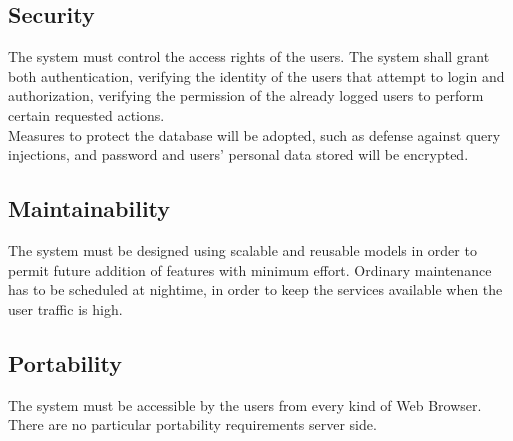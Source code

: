 \subsection{Security}
\label{subsec:security}%
The system must control the access rights of the users. The system shall grant both authentication, verifying the identity of the users that attempt to login and authorization, verifying the permission of the already logged users to perform certain requested actions. \\
Measures to protect the database will be adopted, such as defense against query injections, and password and users' personal data stored will be encrypted.


\subsection{Maintainability}
\label{subsec:maintainability}%
The system must be designed using scalable and reusable models in order to permit future addition of features with minimum effort. 
Ordinary maintenance has to be scheduled at nightime, in order to keep the services available when the user traffic is high.

\subsection{Portability}
\label{subsec:portability}%
The system must be accessible by the users from every kind of Web Browser. 
There are no particular portability requirements server side.



